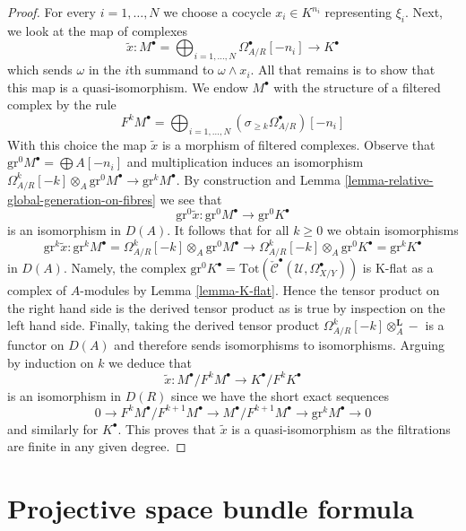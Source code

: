 \begin{proof}
\medskip\noindent
For every $i = 1, \ldots, N$ we choose a cocycle $x_i \in K^{n_i}$
representing $\xi_i$. Next, we look at the map of complexes
$$
\tilde x :
M^\bullet = \bigoplus\nolimits_{i = 1, \ldots, N}
\Omega^\bullet_{A/R}[-n_i]
\longrightarrow
K^\bullet
$$
which sends $\omega$ in the $i$th summand to $\omega \wedge x_i$.
All that remains is to show that this map is a quasi-isomorphism.
We endow $M^\bullet$ with the structure of a filtered complex
by the rule
$$
F^kM^\bullet =
\bigoplus\nolimits_{i = 1, \ldots, N}
(\sigma_{\geq k}\Omega^\bullet_{A/R})[-n_i]
$$
With this choice the map $\tilde x$ is a morphism of filtered complexes.
Observe that $\text{gr}^0M^\bullet = \bigoplus A[-n_i]$
and multiplication induces an isomorphism
$\Omega^k_{A/R}[-k] \otimes_A \text{gr}^0M^\bullet \to \text{gr}^kM^\bullet$.
By construction and Lemma \ref{lemma-relative-global-generation-on-fibres}
we see that
$$
\text{gr}^0\tilde x :
\text{gr}^0M^\bullet \longrightarrow
\text{gr}^0K^\bullet
$$
is an isomorphism in $D(A)$. It follows that for all $k \geq 0$
we obtain isomorphisms
$$
\text{gr}^k \tilde x :
\text{gr}^kM^\bullet = \Omega^k_{A/R}[-k] \otimes_A \text{gr}^0M^\bullet
\longrightarrow
\Omega^k_{A/R}[-k] \otimes_A \text{gr}^0K^\bullet =
\text{gr}^kK^\bullet
$$
in $D(A)$. Namely, the complex
$\text{gr}^0K^\bullet =
\text{Tot}(\check{\mathcal{C}}^\bullet(\mathcal{U}, \Omega_{X/Y}^\bullet))$
is K-flat as a complex of $A$-modules by Lemma \ref{lemma-K-flat}.
Hence the tensor product on the right hand side is the
derived tensor product as is true by inspection on the left hand side.
Finally, taking the derived tensor product
$\Omega^k_{A/R}[-k] \otimes_A^\mathbf{L} -$ is a functor on $D(A)$
and therefore sends isomorphisms to isomorphisms.
Arguing by induction on $k$ we deduce that
$$
\tilde x : M^\bullet/F^kM^\bullet \to K^\bullet/F^kK^\bullet
$$
is an isomorphism in $D(R)$ since we have the short exact sequences
$$
0 \to F^kM^\bullet/F^{k + 1}M^\bullet \to
M^\bullet/F^{k + 1}M^\bullet \to
\text{gr}^kM^\bullet \to 0
$$
and similarly for $K^\bullet$. This proves that $\tilde x$ is a
quasi-isomorphism as the filtrations are finite in any given degree.
\end{proof}






\section{Projective space bundle formula}
\label{section-projective-space-bundle-formula}

